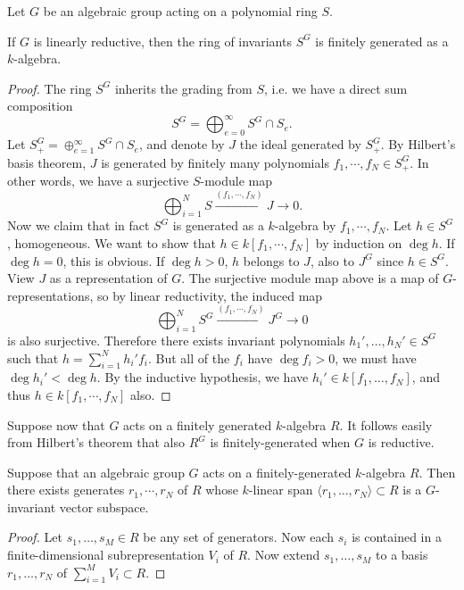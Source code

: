 \documentclass[11pt, english]{article}
\begin{document}
Let $G$ be an algebraic group acting on a polynomial ring $S$.

\begin{thm}[Hilbert]
If $G$ is linearly reductive, then the ring of invariants $S^G$ is finitely generated as a $k$-algebra.
\end{thm}
\begin{proof}
The ring $S^G$ inherits the grading from $S$, i.e. we have a direct sum composition
$$
S^G = \bigoplus_{e=0}^\infty S^G \cap S_e.
$$
Let $S_+^G = \oplus_{e=1}^\infty S^G \cap S_e$, and denote by $J$ the ideal generated by $S_+^G$. By Hilbert's basis theorem, $J$ is generated by finitely many polynomials $f_1,\cdots,f_N \in S_+^G$. In other words, we have a surjective $S$-module map
$$
\bigoplus_{i=1}^N S \xrightarrow{(f_1,\cdots,f_N)} J \to 0.
$$
Now we claim that in fact $S^G$ is generated as a $k$-algebra by $f_1,\cdots,f_N$. Let $h \in S^G$, homogeneous. We want to show that $h \in k[f_1,\cdots,f_N]$ by induction on $\deg h$. If $\deg h = 0$, this is obvious. If $\deg h> 0$, $h$ belongs to $J$, also to $J^G$ since $h \in S^G$. View $J$ as a representation of $G$. The surjective module map above is a map of $G$-representations, so by linear reductivity, the induced map
$$
\bigoplus_{i=1}^N S^G \xrightarrow{(f_1,\cdots,f_N)} J^G \to 0
$$
is also surjective. Therefore there exists invariant polynomials $h_1',\ldots,h_N' \in S^G$ such that $h= \sum_{i=1}^N h_i' f_i$. But all of the $f_i$ have $\deg f_i > 0$, we must have $\deg h_i' < \deg h$. By the inductive hypothesis, we have $h_i' \in k[f_1,\ldots,f_N]$, and thus $h \in k[f_1,\cdots,f_N]$ also.
\end{proof}

Suppose now that $G$ acts on a finitely generated $k$-algebra $R$. It follows easily from Hilbert's theorem that also $R^G$ is finitely-generated when $G$ is reductive.

\begin{lemma}
 Suppose that an algebraic group $G$ acts on a finitely-generated $k$-algebra $R$. Then there exists generates $r_1,\cdots,r_N$ of $R$ whose $k$-linear span $\langle r_1,\ldots, r_N \rangle \subset R$ is a $G$-invariant vector subspace.
\end{lemma}
\begin{proof}
Let $s_1,\ldots,s_M \in R$ be any set of generators. Now each $s_i$ is contained in a finite-dimensional subrepresentation $V_i$ of $R$. Now extend $s_1,\ldots, s_M$ to a basis $r_1,\ldots, r_N$ of $\sum_{i=1}^M V_i \subset R$.
\end{proof}
\end{document}
